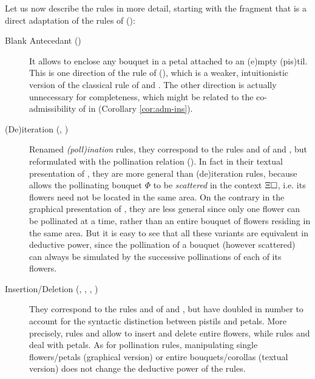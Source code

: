 Let us now describe the rules in more detail, starting with the fragment that is
a direct adaptation of the rules of  ():

\begin{description}
  \item[Blank Antecedant ()]
    It allows to enclose any bouquet in a petal attached to an
    \textsf{(e)}mpty \textsf{(pis)}til. This is one
    direction of the rule  of (), which is
    a weaker, intuitionistic version of the classical rule  of
     and . The other direction is actually unnecessary for
    completeness, which might be related to the co-admissibility of
     in  (Corollary \ref{cor:adm-ins}).

  \item[(De)iteration (, )]
    Renamed \emph{\textsf{(poll)}ination} rules, they correspond to the rules
     and  of  and , but reformulated
    with the pollination relation (). In fact in their
    textual presentation of , they are more general than
    (de)iteration rules, because  allows the pollinating
    bouquet $\Phi$ to be \emph{scattered} in the context $\Xi\square$, i.e. its
    flowers need not be located in the same area. On the contrary in the
    graphical presentation of , they are less general
    since only one flower can be pollinated at a time, rather than an entire
    bouquet of flowers residing in the same area. But it is easy to see that all
    these variants are equivalent in deductive power, since the pollination of a
    bouquet (however scattered) can always be simulated by the successive
    pollinations of each of its flowers.

  \item[Insertion/Deletion (, , , )]
    They correspond to the rules  and  of  and
    , but have doubled in number to account for the syntactic
    distinction between pistils and petals. More precisely, rules  and
     allow to insert and delete entire flowers, while rules 
    and  deal with petals. As for pollination rules, manipulating
    single flowers/petals (graphical version) or entire bouquets/corollas
    (textual version) does not change the deductive power of the rules.
    

\end{description}

